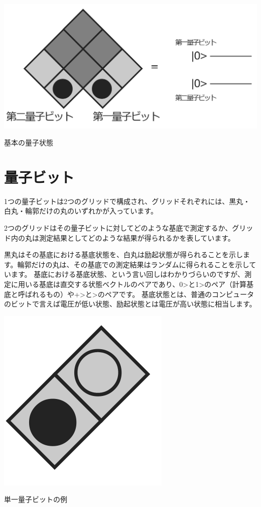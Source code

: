 \begin{reviewimage}
\includegraphics[width=0.8\maxwidth]{./images/image1.png}
\caption{基本の量子状態}
\label{image:01:image1}
\end{reviewimage}

\section*{量子ビット}
\label{sec:1-3}

1つの量子ビットは2つのグリッドで構成され、グリッドそれぞれには、黒丸・白丸・輪郭だけの丸のいずれかが入っています。

2つのグリッドはその量子ビットに対してどのような基底で測定するか、グリッド内の丸は測定結果としてどのような結果が得られるかを表しています。

黒丸はその基底における基底状態を、白丸は励起状態が得られることを示します。輪郭だけの丸は、その基底での測定結果はランダムに得られることを示しています。
基底における基底状態、という言い回しはわかりづらいのですが、測定に用いる基底は直交する状態ベクトルのペアであり、\textbar{}0\textgreater{}と\textbar{}1\textgreater{}のペア（計算基底と呼ばれるもの）や\textbar{}+\textgreater{}と\textbar{}{-}\textgreater{}のペアです。
基底状態とは、普通のコンピュータのビットで言えば電圧が低い状態、励起状態とは電圧が高い状態に相当します。

\begin{reviewimage}
\includegraphics[width=0.3\maxwidth]{./images/image2s.png}
\caption{単一量子ビットの例}
\label{image:01:image2s}
\end{reviewimage}

